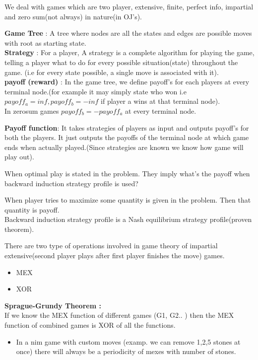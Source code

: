 \documentclass[../Notes.tex]{subfiles}
\begin{document}
We deal with games which are two player, extensive, finite, perfect info, impartial and zero sum(not always) in nature(in OJ's).
 
\textbf{Game Tree} : A tree where nodes are all the states and edges are possible moves with root as starting state.\\
\textbf{Strategy} : For a player, A strategy is a complete algorithm for playing the game, telling a player what to do for every possible situation(state) throughout the game. (i.e for every state possible, a single move is associated with it).\\
\textbf{payoff (reward)} : In the game tree, we define payoff's for each players at every terminal node.(for example it may simply state who won i.e $payoff_{a}=inf, payoff_{b}=-inf$ if player a wins at that terminal node).\\
In zerosum games $payoff_{b} = -payoff_{a}$ at every terminal node.

\textbf{Payoff function}: It takes strategies of players as input and outputs payoff's for both the players. It just outputs the payoffs of the terminal node at which game ends when actually played.(Since strategies are known we know how game will play out).

When optimal play is stated in the problem. They imply what's the payoff when backward induction strategy profile is used?

When player tries to maximize some quantity is given in the problem. Then that quantity is payoff.\\
Backward induction strategy profile is a Nash equilibrium strategy profile(proven theorem).
\pagebreak

There are two type of operations involved in game theory of impartial extensive(second player plays after first player finishes the move) games.
\begin{itemize}
	\item MEX
	\item XOR
\end{itemize}

\textbf{Sprague-Grundy Theorem :} \\

If we know the MEX function of different games (G1, G2.. ) then the MEX function of combined games is XOR of all the functions.

\begin{itemize}
	\item In a nim game with custom moves (examp. we can remove 1,2,5 stones at once) there will always be a periodicity of mexes with number of stones.
\end{itemize}
\end{document}
